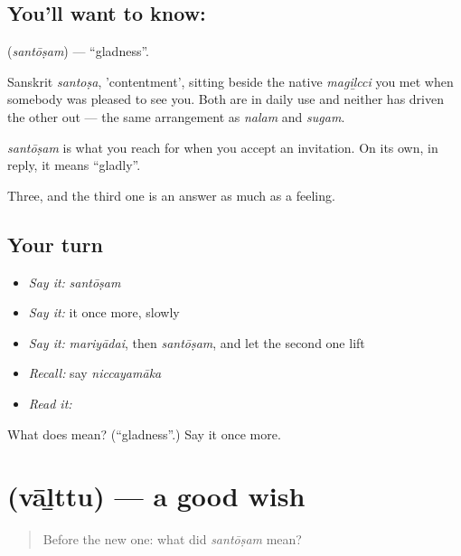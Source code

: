 \subsection*{You'll want to know: }
\textbf{} (\emph{santōṣam}) — \textquotedblleft{}gladness\textquotedblright{}.

Sanskrit \emph{santoṣa}, 'contentment', sitting beside the native \emph{magiḻcci} you met when somebody was pleased to see you. Both are in daily use and neither has driven the other out — the same arrangement as \emph{nalam} and \emph{sugam}.

\emph{santōṣam} is what you reach for when you accept an invitation. On its own, in reply, it means \textquotedblleft{}gladly\textquotedblright{}.

\begin{grammarlens}[title={What you've built}]
Three, and the third one is an answer as much as a feeling.
\end{grammarlens}

\subsection*{Your turn}
\begin{itemize}
\raggedright
  \item \emph{Say it:} \emph{santōṣam}
  \item \emph{Say it:} it once more, slowly
  \item \emph{Say it:} \emph{mariyādai}, then \emph{santōṣam}, and let the second one lift
  \item \emph{Recall:} say \emph{niccayamāka}
  \item \emph{Read it:} \textbf{}
\end{itemize}

\begin{tcolorbox}[breakable,colback=teal!4,colframe=teal!35!black,title={Before you move on}]
What does  mean? (\textquotedblleft{}gladness\textquotedblright{}.) Say it once more.
\end{tcolorbox}
\section[\texorpdfstring{\ta{வாழ்த்து} (vāḻttu)}{வாழ்த்து (vāḻttu)}]{ (vāḻttu) — a good wish}

\label{lesson:TA-C49-good-wish}



\begin{quote}
Before the new one: what did \emph{santōṣam} mean?
\end{quote}

